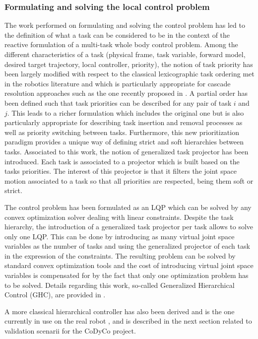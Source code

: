 \documentclass[final,5p,twocolumn]{elsarticle}
\begin{document}
\subsubsection{Formulating and solving the local control problem}
The work performed on formulating  and solving the control problem has led to the definition of what a task can be considered to be in the context of the reactive formulation of a multi-task whole body control problem. Among the different characteristics of a task (physical frame, task variable, forward model, desired target trajectory, local controller, priority), the notion of task priority has been largely modified with respect to the classical lexicographic task ordering met in the robotics literature and which is particularly appropriate for cascade resolution approaches such as the one recently proposed in \cite{escande2012}. A partial order has been defined such that task priorities can be described for any pair of task $i$ and $j$. This leads to a richer formulation which includes the original one but is also particularly appropriate for describing task insertion and removal processes as well as priority switching between tasks. Furthermore, this new prioritization paradigm provides a unique way of defining strict and soft hierarchies between tasks. Associated to this work, the notion  of generalized task projector has been introduced. Each task is associated to a projector which is built based on the tasks priorities. The interest of this projector is that it filters the joint space motion associated to a task so that all priorities are respected, being them soft or strict.

The control problem has been formulated as an LQP \cite{Salini-2011-ID348} which can be solved by any convex optimization solver dealing with linear constraints. Despite the task hierarchy, the introduction of a generalized task projector per task allows to solve only one LQP. This can be done by introducing as many virtual joint space variables as the number of tasks and using the generalized projector of each task in the expression of the constraints. The resulting problem can be solved by standard convex optimization tools and the cost of introducing virtual joint space variables is compensated for by the fact that only one optimization problem has to be solved. Details regarding this work, so-called Generalized Hierarchical Control (GHC), are provided in \cite{liu2015}. 

A more classical hierarchical controller has also  been derived and is the one currently in use on the real robot \cite{DelPrete-2014-ID267}, \cite{noriFrontiers2015} and is described in the next section related to validation scenarii for the CoDyCo project.\\
\end{document}
